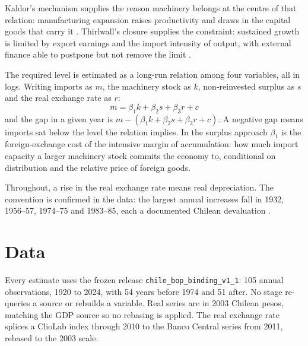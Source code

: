\documentclass[11pt]{article}
\begin{document}
Kaldor's mechanism supplies the reason machinery belongs at the centre of that relation: manufacturing expansion raises productivity and draws in the capital goods that carry it \citep{kaldor1967,kaldor1970}. Thirlwall's closure supplies the constraint: sustained growth is limited by export earnings and the import intensity of output, with external finance able to postpone but not remove the limit \citep{thirlwall1979,thirlwall1982,morenobrid2003}.

The required level is estimated as a long-run relation among four variables, all in logs. Writing imports as $m$, the machinery stock as $k$, non-reinvested surplus as $s$ and the real exchange rate as $r$:
\begin{equation}
m = \beta_1 k + \beta_2 s + \beta_3 r + c
\end{equation}
and the gap in a given year is $m - (\beta_1 k + \beta_2 s + \beta_3 r + c)$. A negative gap means imports sat below the level the relation implies. In the surplus approach $\beta_1$ is the foreign-exchange cost of the intensive margin of accumulation: how much import capacity a larger machinery stock commits the economy to, conditional on distribution and the relative price of foreign goods.

Throughout, a rise in the real exchange rate means real depreciation. The convention is confirmed in the data: the largest annual increases fall in 1932, 1956--57, 1974--75 and 1983--85, each a documented Chilean devaluation \citep{ffd1983a,ffd2002}.

\FloatBarrier
\section{Data}

Every estimate uses the frozen release \texttt{chile\_bop\_binding\_v1\_1}: 105 annual observations, 1920 to 2024, with 54 years before 1974 and 51 after. No stage re-queries a source or rebuilds a variable. Real series are in 2003 Chilean pesos, matching the GDP source so no rebasing is applied. The real exchange rate splices a ClioLab index through 2010 to the Banco Central series from 2011, rebased to the 2003 scale.
\end{document}
